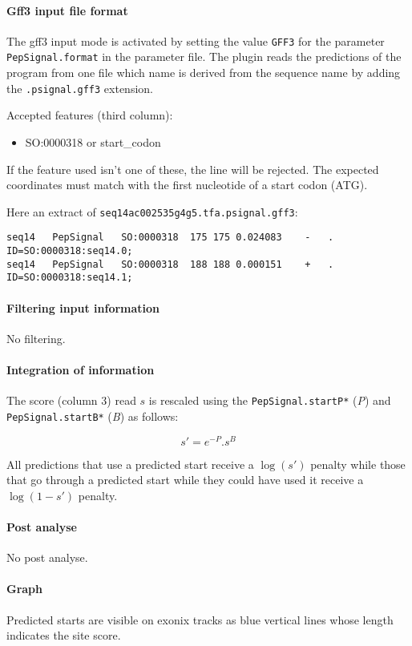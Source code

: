\paragraph{Gff3 input file format}

The gff3 input mode is activated by setting the value \texttt{GFF3}
for the parameter \texttt{PepSignal.format} in the parameter file.
The plugin reads the predictions of the program from one file which
name is derived from the sequence name by adding the
\texttt{.psignal.gff3} extension.

Accepted features (third column):\\
\begin{itemize}
\item  SO:0000318 or start\_codon
\end{itemize}
If the feature used isn't one of these, the line will be rejected. The
expected coordinates must match with the first nucleotide of a
start codon (ATG).

Here an extract of \texttt{seq14ac002535g4g5.tfa.psignal.gff3}:
\begin{Verbatim}[fontsize=\tiny]
seq14	PepSignal	SO:0000318	175	175	0.024083	-	.	ID=SO:0000318:seq14.0;
seq14	PepSignal	SO:0000318	188	188	0.000151	+	.	ID=SO:0000318:seq14.1;
\end{Verbatim}

\paragraph{Filtering input information}

No filtering.


\paragraph{Integration of information}

The score (column 3) read $s$ is rescaled using the {\tt PepSignal.startP*} 
(\emph{P}) and {\tt PepSignal.startB*} (\emph{B}) as follows:

\[s' = e^{-P}.s^B\]

All predictions that use a predicted start receive a $\log(s')$
penalty while those that go through a predicted start while they
could have used it receive a $\log(1-s')$ penalty.


\paragraph{Post analyse}

No post analyse.


\paragraph{Graph}

Predicted starts are visible on exonix tracks as blue vertical lines
whose length indicates the site score.

